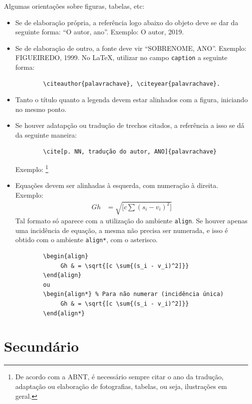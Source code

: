 \documentclass[a4paper,12pt,oneside,onecolumn,final,fleqn]{repUERJ}
\begin{document}
Algumas orientações sobre figuras, tabelas, etc:
\begin{itemize}
    \item Se de elaboração própria, a referência logo abaixo do objeto deve se dar da seguinte forma: ``O autor, ano''. Exemplo: O autor, 2019.
    \item Se de elaboração de outro, a fonte deve vir ``SOBRENOME, ANO''. Exemplo: FIGUEIREDO, 1999. No \LaTeX, utilizar no campo \texttt{caption} a seguinte forma: 
    \begin{verbatim}
        \citeauthor{palavrachave}, \citeyear{palavrachave}.
    \end{verbatim}
    \item Tanto o título quanto a legenda devem estar alinhados com a figura, iniciando no mesmo ponto. 
    \item Se houver adatapção ou tradução de trechos citados, a referência a isso se dá da seguinte maneira:
    \begin{verbatim}
        \cite[p. NN, tradução do autor, ANO]{palavrachave}
    \end{verbatim}
    Exemplo: 
    \cite[p. 22, tradução do autor, 2019]{bib:Bernstein1997}\footnote{De acordo com a ABNT, é necessário sempre citar o ano da tradução, adaptação ou elaboração de fotografias, tabelas, ou seja, ilustrações em geral.}
    \item Equações devem ser alinhadas à esquerda, com numeração à direita. Exemplo:
    \begin{align}
    Gh & = \sqrt{[c \sum{(s_i - v_i)^2]}}
    \end{align}
    Tal formato só aparece com a utilização do ambiente \texttt{align}. Se houver apenas uma incidência de equação, a mesma não precisa ser numerada, e isso é obtido com o ambiente \texttt{align*}, com o asterisco. 
    \begin{verbatim}
        \begin{align}
             Gh & = \sqrt{[c \sum{(s_i - v_i)^2]}}
        \end{align}
        ou
        \begin{align*} % Para não numerar (incidência única)
             Gh & = \sqrt{[c \sum{(s_i - v_i)^2]}}
        \end{align*}
    \end{verbatim}
\end{itemize}


\section{Secundário}
\end{document}
